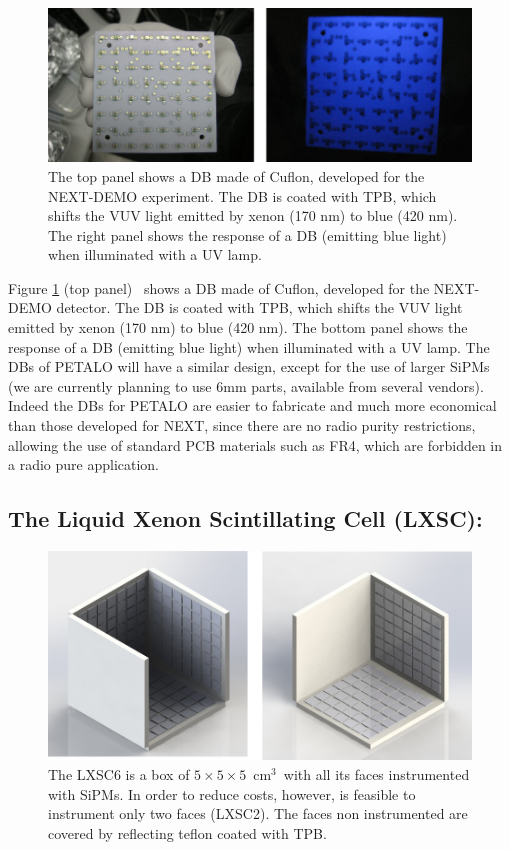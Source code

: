 \documentclass{JINST}
\begin{document}
\begin{figure}[!htb]
	\centering
	\includegraphics[scale=0.5]{img/DC.png}
	\caption{\label{fig.DB} The top panel shows a DB made of Cuflon, developed for the NEXT-DEMO experiment. The DB is coated with TPB, which shifts the VUV light emitted by xenon (170 nm) to blue (420 nm). The right panel shows the response of a DB (emitting blue light) when illuminated with a UV lamp.  }
\end{figure}

Figure \ref{fig.DB} (top panel) ~shows a DB made of Cuflon, developed for the NEXT-DEMO detector. The DB is coated with TPB, which shifts the VUV light emitted by xenon (170 nm) to blue (420 nm). The bottom panel shows the response of a DB (emitting blue light) when illuminated with a UV lamp. The DBs of PETALO will have a similar design, except for the use of larger SiPMs (we are currently planning to use 6mm parts, available from several vendors).
Indeed the DBs for PETALO are easier to fabricate and much more economical than those developed for NEXT, since there are no radio purity restrictions, allowing the use of standard PCB materials such as FR4, which are forbidden in a radio pure application.

\subsection{The Liquid Xenon Scintillating Cell (LXSC):}

\label{sec.lxsc}

\begin{figure}[!htb]
	\centering
	\includegraphics[scale=0.5]{img/lxsc.png}
	\caption{\label{fig.box} The LXSC6 is a box of 
	$5\times 5 \times 5$~cm$^3$~with all its faces instrumented with SiPMs. In order to reduce costs, however, is feasible to instrument only two faces (LXSC2). The faces non instrumented are covered by reflecting teflon coated with TPB. }
\end{figure}
\end{document}
